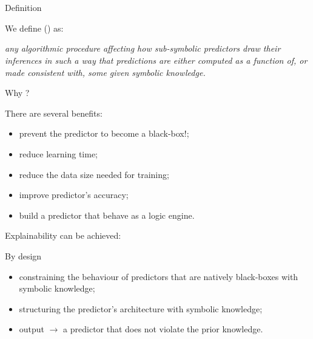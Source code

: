 \documentclass[presentation]{beamer}\mode<presentation>{\usetheme{AMSBolognaFC}}
\begin{document}
\section{\longski}
    
\begin{frame}[c]{Definition}
    \begin{block}{We define \longski{}(\ski) as: }
        \begin{displayquote}\itshape
            any \emph{algorithmic} procedure affecting how \alert{sub-symbolic predictors} draw their inferences in such a way that predictions are either \emph{computed} as a function of, or made \emph{consistent} with, some \emph{given} \alert{symbolic knowledge}.
        \end{displayquote}
    \end{block}
    
\end{frame}


\begin{frame}[allowframebreaks]{Why \ski?}
    \begin{block}{There are several benefits:}
        \begin{itemize}
            \item prevent the predictor to become a black-box\alert{!};
            \item reduce learning time;
            \item reduce the data size needed for training;
            \item improve predictor's accuracy;
            \item build a predictor that behave as a logic engine.
        \end{itemize}
    \end{block}

     \framebreak

    Explainability  can be achieved:
    
    \begin{block}{By design}
        \begin{itemize}
            \item constraining the behaviour of predictors that are natively black-boxes with symbolic knowledge;
            \item structuring the predictor's architecture with symbolic knowledge;
            \item output $\rightarrow$ a predictor that does not violate the prior knowledge.
        \end{itemize}
    \end{block}
    
\end{frame}
\end{document}
